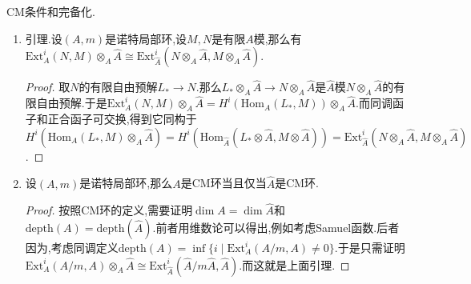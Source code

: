 CM条件和完备化.
\begin{enumerate}
	\item 引理.设$(A,m)$是诺特局部环,设$M,N$是有限$A$模,那么有$\mathrm{Ext}_A^i(N,M)\otimes_A\widehat{A}\cong\mathrm{Ext}_{\widehat{A}}^i(N\otimes_A\widehat{A},M\otimes_A\widehat{A})$.
	\begin{proof}
		
		取$N$的有限自由预解$L_*\to N$.那么$L_*\otimes_A\widehat{A}\to N\otimes_A\widehat{A}$是$\widehat{A}$模$N\otimes_A\widehat{A}$的有限自由预解.于是$\mathrm{Ext}_A^i(N,M)\otimes_A\widehat{A}=H^i(\mathrm{Hom}_A(L_*,M))\otimes_A\widehat{A}$.而同调函子和正合函子可交换,得到它同构于$H^i(\mathrm{Hom}_A(L_*,M)\otimes_A\widehat{A})=H^i(\mathrm{Hom}_{\widehat{A}}(L_*\otimes\widehat{A},M\otimes\widehat{A}))=\mathrm{Ext}_{\widehat{A}}^i(N\otimes_A\widehat{A},M\otimes_A\widehat{A})$.
	\end{proof}
	\item 设$(A,m)$是诺特局部环,那么$A$是CM环当且仅当$\widehat{A}$是CM环.
	\begin{proof}
		
		按照CM环的定义,需要证明$\dim A=\dim\widehat{A}$和$\mathrm{depth}(A)=\mathrm{depth}(\widehat{A})$.前者用维数论可以得出,例如考虑Samuel函数.后者因为,考虑同调定义$\mathrm{depth}(A)=\inf\{i\mid\mathrm{Ext}_A^i(A/m,A)\not=0\}$.于是只需证明$\mathrm{Ext}_A^i(A/m,A)\otimes_A\widehat{A}\cong\mathrm{Ext}_{\widehat{A}}^i(\widehat{A}/m\widehat{A},\widehat{A})$.而这就是上面引理.
	\end{proof}
\end{enumerate}

